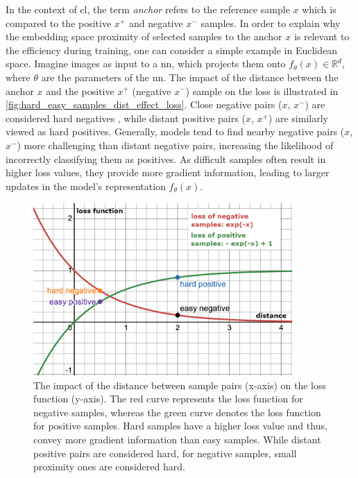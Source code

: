 In the context of \ac{cl}, the term \textit{anchor} refers to the reference sample $x$ 
which is compared to the positive $x^+$ and negative $x^-$ samples.
In order to explain why the embedding space proximity of selected samples to the anchor $x$ 
is relevant to the efficiency during training, 
one can consider a simple example in Euclidean space.
Imagine images as input to a \ac{nn}, which projects them onto $f_{\theta}(x) \in \mathbb{R}^d$, 
where $\theta$ are the parameters of the \ac{nn}.
The impact of the distance between the anchor $x$ and the positive $x^+$ (negative $x^-$) 
sample on the loss is illustrated in \autoref{fig:hard_easy_samples_dist_effect_loss}.
Close negative pairs ($x$, $x^-$) are considered hard negatives \citep{robinson_contrastive_2021}, 
while distant positive pairs ($x$, $x^+$) are similarly viewed as hard positives.
Generally, models tend to find nearby negative pairs ($x$, $x^-$) more challenging than distant negative pairs, 
increasing the likelihood of incorrectly classifying them as positives.
As difficult samples often result in higher loss values, 
they provide more gradient information, %
leading to larger updates in the model's representation $f_{\theta}(x)$.

\begin{figure}[!htb] %
    \centering
    \includegraphics[width=280pt]{images/Hard_easy_samples_dist_effect_loss_desmos_legend.png}
    \caption{The impact of the distance between sample pairs (x-axis) on the loss function (y-axis).
    The red curve represents the loss function for negative samples, 
    whereas the green curve denotes the loss function for positive samples.
    Hard samples have a higher loss value and thus, convey more gradient information than easy samples.
    While distant positive pairs are considered hard, for negative samples, small proximity ones are considered hard.}
    \label{fig:hard_easy_samples_dist_effect_loss}
\end{figure}